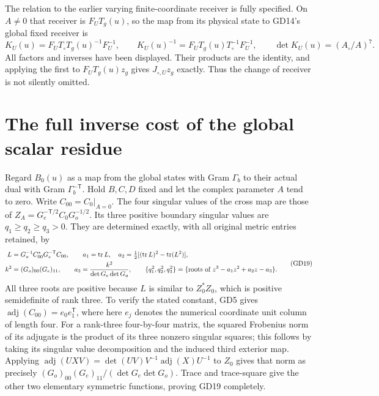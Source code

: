 The relation to the earlier varying finite-coordinate
receiver is fully specified. On $A\ne0$ that receiver
is $F_UT_g(u)$, so the map from its physical state to
GD14's global fixed receiver is
\begin{equation}
 K_U(u)=F_UT_\circ T_g(u)^{-1}F_U^{-1},\qquad
 K_U(u)^{-1}=F_UT_g(u)T_\circ^{-1}F_U^{-1},\qquad
 \det K_U(u)=(A_\circ/A)^7.
 \tag{GD18}
\end{equation}
All factors and inverses have been displayed. Their
products are the identity, and applying the first to
$F_UT_g(u)z_g$ gives $J_{\circ,U}z_g$ exactly.
Thus the change of receiver is not silently omitted.

\section{The full inverse cost of the global scalar residue}
Regard $B_0(u)$ as a map from the global states with
Gram $\Gamma_b$ to their actual dual with Gram
$\Gamma_b^{-\mathsf T}$. Hold $B,C,D$ fixed and let
the complex parameter $A$ tend to zero. Write $C_{00}=C_0|_{A=0}$.
The four singular values of the cross map are those of
$Z_A=G_e^{-\mathsf T/2}C_0G_o^{-1/2}$. Its three
positive boundary singular values are $q_1\ge q_2\ge q_3>0$.
They are determined exactly, with all original metric
entries retained, by
\begin{equation}
\begin{aligned}
 L&=G_o^{-1}C_{00}^*G_e^{-\mathsf T}C_{00},\qquad
 a_1=\operatorname{tr}L,\quad
 a_2=\tfrac12[(\operatorname{tr}L)^2-\operatorname{tr}(L^2)],\\
 k^2&=(G_o)_{00}(G_e)_{11},\qquad
 a_3=\frac{k^2}{\det G_e\det G_o},\qquad
 \{q_1^2,q_2^2,q_3^2\}
   =\{\hbox{roots of }z^3-a_1z^2+a_2z-a_3\}.
\end{aligned}\tag{GD19}
\end{equation}
All three roots are positive because $L$ is similar to
$Z_0^*Z_0$, which is positive semidefinite of rank three.
To verify the stated constant, GD5 gives
$\operatorname{adj}(C_{00})=e_0e_1^{\mathsf T}$,
where here $e_j$ denotes the numerical coordinate unit
column of length four. For a rank-three four-by-four
matrix, the squared Frobenius norm of its adjugate is
the product of its three nonzero singular squares;
this follows by taking its singular value decomposition
and the induced third exterior map. Applying
$\operatorname{adj}(UXV)=\det(UV)V^{-1}\operatorname{adj}(X)U^{-1}$
to $Z_0$ gives that norm as precisely
$(G_o)_{00}(G_e)_{11}/(\det G_e\det G_o)$.
Trace and trace-square give the other two elementary
symmetric functions, proving GD19 completely.

